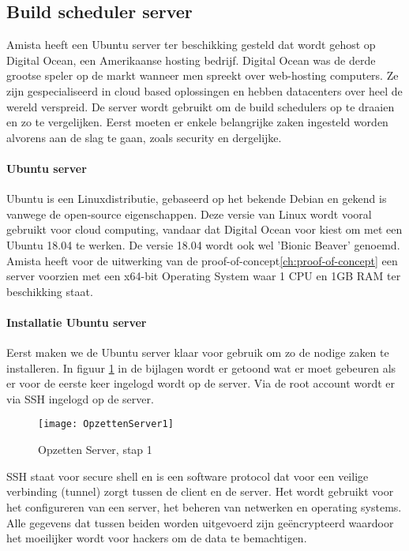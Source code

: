         \subsection{Build scheduler server}
        Amista heeft een Ubuntu server ter beschikking gesteld dat wordt gehost op Digital Ocean, een Amerikaanse hosting bedrijf. Digital Ocean was de derde grootse speler op de markt wanneer men spreekt over web-hosting computers. Ze zijn gespecialiseerd in cloud based oplossingen en hebben datacenters over heel de wereld verspreid. De server wordt gebruikt om de build schedulers op te draaien en zo te vergelijken. Eerst moeten er enkele belangrijke zaken ingesteld worden alvorens aan de slag te gaan, zoals security en dergelijke.
            
            \paragraph{Ubuntu server}
            Ubuntu is een Linuxdistributie, gebaseerd op het bekende Debian en gekend is vanwege de open-source eigenschappen.
            Deze versie van Linux wordt vooral gebruikt voor cloud computing, vandaar dat Digital Ocean voor kiest om met een Ubuntu 18.04 te werken.
            De versie 18.04 wordt ook wel 'Bionic Beaver' genoemd.
            Amista heeft voor de uitwerking van de proof-of-concept\ref{ch:proof-of-concept} een server voorzien met een x64-bit Operating System waar 1 CPU en 1GB RAM ter beschikking staat.
            
            \paragraph{Installatie Ubuntu server}
            Eerst maken we de Ubuntu server klaar voor gebruik om zo de nodige zaken te installeren.
            In figuur \ref{OpzettenServer1} in de bijlagen wordt er getoond wat er moet gebeuren als er voor de eerste keer ingelogd wordt op de server.
            Via de root account wordt er via SSH ingelogd op de server. 
            
            \begin{figure}
                \centering
                \texttt{[image: OpzettenServer1]}
                \caption{Opzetten Server, stap 1} \label{OpzettenServer1}
            \end{figure}
            
            SSH staat voor secure shell en is een software protocol dat voor een veilige verbinding (tunnel) zorgt tussen de client en de server. Het wordt gebruikt voor het configureren van een server, het beheren van netwerken en operating systems. Alle gegevens dat tussen beiden worden uitgevoerd zijn geëncrypteerd waardoor het moeilijker wordt voor hackers om de data te bemachtigen.
            
